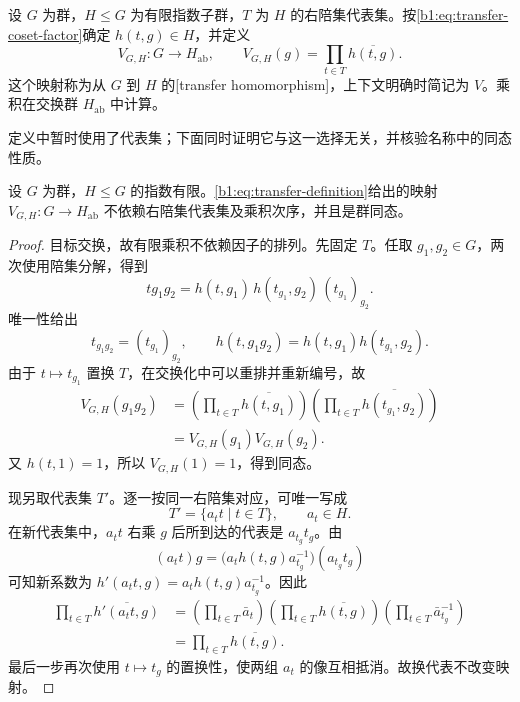 \begin{definition}\label{b1:def:transfer}
	设 \(G\) 为群，\(H\leq G\) 为有限指数子群，\(T\) 为 \(H\) 的右陪集代表集。按\eqref{b1:eq:transfer-coset-factor}确定 \(h(t,g)\in H\)，并定义
	\begin{equation}\label{b1:eq:transfer-definition}
		V_{G,H}:G\longrightarrow H_{\mathrm{ab}},\qquad
		V_{G,H}(g)=\prod_{t\in T}\overline{h(t,g)}.
	\end{equation}
	这个映射称为从 \(G\) 到 \(H\) 的[transfer homomorphism]，上下文明确时简记为 \(V\)。乘积在交换群 \(H_{\mathrm{ab}}\) 中计算。
\end{definition}

定义中暂时使用了代表集；下面同时证明它与这一选择无关，并核验名称中的同态性质。

\begin{proposition}\label{b1:prop:transfer-well-defined}
	设 \(G\) 为群，\(H\leq G\) 的指数有限。\eqref{b1:eq:transfer-definition}给出的映射 \(V_{G,H}:G\rightarrow H_{\mathrm{ab}}\) 不依赖右陪集代表集及乘积次序，并且是群同态。
\end{proposition}

\begin{proof}
	目标交换，故有限乘积不依赖因子的排列。先固定 \(T\)。任取 \(g_1,g_2\in G\)，两次使用陪集分解，得到
	\[
		tg_1g_2=h(t,g_1)\,h(t_{g_1},g_2)\,(t_{g_1})_{g_2}.
	\]
	唯一性给出
	\[
		t_{g_1g_2}=(t_{g_1})_{g_2},\qquad
		h(t,g_1g_2)=h(t,g_1)h(t_{g_1},g_2).
	\]
	由于 \(t\mapsto t_{g_1}\) 置换 \(T\)，在交换化中可以重排并重新编号，故
	\[
		\begin{aligned}
			V_{G,H}(g_1g_2)
			&=\left(\prod_{t\in T}\overline{h(t,g_1)}\right)
			  \left(\prod_{t\in T}\overline{h(t_{g_1},g_2)}\right)\\
			&=V_{G,H}(g_1)V_{G,H}(g_2).
		\end{aligned}
	\]
	又 \(h(t,1)=1\)，所以 \(V_{G,H}(1)=1\)，得到同态。

	现另取代表集 \(T'\)。逐一按同一右陪集对应，可唯一写成
	\[
		T'=\{a_tt\mid t\in T\},\qquad a_t\in H.
	\]
	在新代表集中，\(a_tt\) 右乘 \(g\) 后所到达的代表是 \(a_{t_g}t_g\)。由
	\[
		(a_tt)g
		=\bigl(a_t h(t,g)a_{t_g}^{-1}\bigr)(a_{t_g}t_g)
	\]
	可知新系数为 \(h'(a_tt,g)=a_t h(t,g)a_{t_g}^{-1}\)。因此
	\[
		\begin{aligned}
			\prod_{t\in T}\overline{h'(a_tt,g)}
			&=\left(\prod_{t\in T}\bar a_t\right)
			  \left(\prod_{t\in T}\overline{h(t,g)}\right)
			  \left(\prod_{t\in T}\bar a_{t_g}^{-1}\right)\\
			&=\prod_{t\in T}\overline{h(t,g)}.
		\end{aligned}
	\]
	最后一步再次使用 \(t\mapsto t_g\) 的置换性，使两组 \(a_t\) 的像互相抵消。故换代表不改变映射。
\end{proof}

